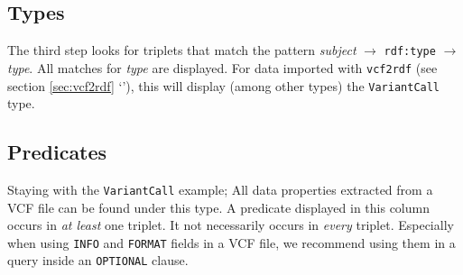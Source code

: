 \subsection{Types}

  The third step looks for triplets that match the pattern \emph{subject}
  $\rightarrow$ \texttt{rdf:type} $\rightarrow$ \emph{type}.  All matches for
  \emph{type} are displayed.  For data imported with \texttt{vcf2rdf} (see
  section \ref{sec:vcf2rdf} {\color{LinkGray}`'}), this
  will display (among other types) the \texttt{VariantCall} type.

\subsection{Predicates}

  Staying with the \texttt{VariantCall} example;  All data properties extracted
  from a VCF file can be found under this type.  A predicate displayed in this
  column occurs in \emph{at least} one triplet.  It not necessarily occurs in
  \emph{every} triplet.  Especially when using \texttt{INFO} and \texttt{FORMAT}
  fields in a VCF file, we recommend using them in a query inside an
  \texttt{OPTIONAL} clause.
